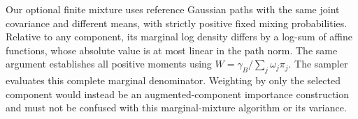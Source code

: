 Our optional finite mixture uses reference Gaussian paths with the same joint covariance and different means, with strictly positive fixed mixing probabilities. Relative to any component, its marginal log density differs by a log-sum of affine functions, whose absolute value is at most linear in the path norm. The same argument establishes all positive moments using $W=\gamma_B/\sum_j\omega_j\pi_j$. The sampler evaluates this complete marginal denominator. Weighting by only the selected component would instead be an augmented-component importance construction and must not be confused with this marginal-mixture algorithm or its variance.
